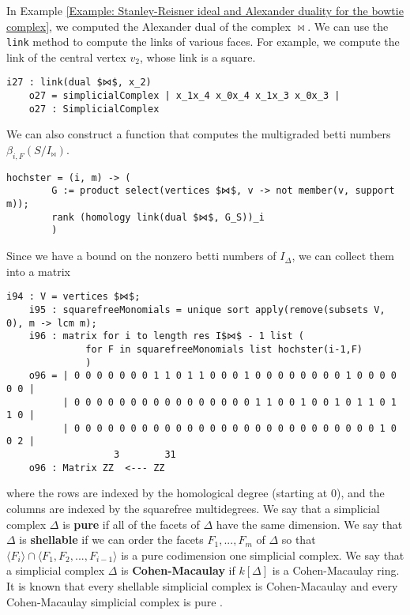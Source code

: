 \documentclass[12pt,leqno]{amsart}
\theoremstyle{definition}
\newenvironment{example}
{\pushQED{\qed}\renewcommand{\qedsymbol}{$\diamond$}\examplex}
{\popQED\endexamplex}
\begin{document}
\begin{example}
  In Example \ref{Example: Stanley-Reisner ideal and Alexander duality for the bowtie complex}, we computed the Alexander dual of the complex $\bowtie$. We can use the \texttt{link} method to compute the links of various faces. For example, we compute the link of the central vertex $v_2$, whose link is a square.
\begin{lstlisting}[basicstyle={\ttfamily \scriptsize}, xleftmargin=-23pt]
    i27 : link(dual $⋈$, x_2)
    o27 = simplicialComplex | x_1x_4 x_0x_4 x_1x_3 x_0x_3 |
    o27 : SimplicialComplex
\end{lstlisting}
  We can also construct a function that computes the multigraded betti numbers $\beta_{i,F}(S/I_{\bowtie})$.
\begin{lstlisting}[basicstyle={\ttfamily \scriptsize}, xleftmargin=-23pt]
    hochster = (i, m) -> (
        G := product select(vertices $⋈$, v -> not member(v, support m));
        rank (homology link(dual $⋈$, G_S))_i
        )
\end{lstlisting}
  Since we have a bound on the nonzero betti numbers of $I_\Delta$, we can collect them into a matrix
\begin{lstlisting}[basicstyle={\ttfamily \scriptsize}, xleftmargin=-23pt]
    i94 : V = vertices $⋈$;
    i95 : squarefreeMonomials = unique sort apply(remove(subsets V, 0), m -> lcm m);
    i96 : matrix for i to length res I$⋈$ - 1 list (
              for F in squarefreeMonomials list hochster(i-1,F)
              )
    o96 = | 0 0 0 0 0 0 0 1 1 0 1 1 0 0 0 1 0 0 0 0 0 0 0 0 1 0 0 0 0 0 0 |
          | 0 0 0 0 0 0 0 0 0 0 0 0 0 0 0 0 1 1 0 0 1 0 0 1 0 1 1 0 1 1 0 |
          | 0 0 0 0 0 0 0 0 0 0 0 0 0 0 0 0 0 0 0 0 0 0 0 0 0 0 0 1 0 0 2 |
                   3        31
    o96 : Matrix ZZ  <--- ZZ
\end{lstlisting}
  where the rows are indexed by the homological degree (starting at $0$), and the columns are indexed by the squarefree multidegrees.
\end{example}
% 
We say that a simplicial complex $\Delta$ is \textbf{pure} if all of the facets of $\Delta$ have the same dimension. We say that $\Delta$ is \textbf{shellable} if we can order the facets $F_1,...,F_m$ of $\Delta$ so that $\langle F_i \rangle \cap \langle F_1,F_2,...,F_{i-1} \rangle$ is a pure codimension one simplicial complex. We say that a simplicial complex $\Delta$ is \textbf{Cohen-Macaulay} if $k[\Delta]$ is a Cohen-Macaulay ring. It is known that every shellable simplicial complex is Cohen-Macaulay \cite[Theorem 5.1.13]{BH} and every Cohen-Macaulay simplicial complex is pure \cite[Corollary 5.1.5]{BH}.
\end{document}
